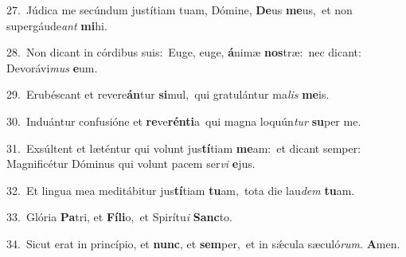{\numbfont\textcolor{\numbcolor}{27.}}~Júdica me secúndum justítiam tuam, Dómine, \textbf{De}\-us \textbf{me}\-us,~\star et non supergáude\textit{ant} \textbf{mi}\-hi.\par
{\numbfont\textcolor{\numbcolor}{28.}}~Non dicant in córdibus suis:~\dagger Euge, euge, \textbf{á}\-nimæ \textbf{nos}\-træ:~\star nec dicant: Devorávi\textit{mus} \textbf{e}\-um.\par
{\numbfont\textcolor{\numbcolor}{29.}}~Erubéscant et revere\-\textbf{án}\-tur \textbf{si}\-mul,~\star qui gratulántur ma\textit{lis} \textbf{me}\-is.\par
{\numbfont\textcolor{\numbcolor}{30.}}~Induántur confusióne et \textbf{re}\-ve\-\textbf{rén}\-\textbf{ti}a~\star qui magna loquún\textit{tur} \textbf{su}\-per me.\par
{\numbfont\textcolor{\numbcolor}{31.}}~Exsúltent et læténtur qui volunt jus\-\textbf{tí}\-tiam \textbf{me}\-am:~\star et dicant semper: Magnificétur Dóminus qui volunt pacem ser\textit{vi} \textbf{e}\-jus.\par
{\numbfont\textcolor{\numbcolor}{32.}}~Et lingua mea meditábitur jus\-\textbf{tí}\-tiam \textbf{tu}\-am,~\star tota die lau\textit{dem} \textbf{tu}\-am.\par
{\numbfont\textcolor{\numbcolor}{33.}}~Glória \textbf{Pa}\-tri, et \textbf{Fí}\-\textbf{li}o,~\star et Spirítu\textit{i} \textbf{Sanc}\-to.\par
{\numbfont\textcolor{\numbcolor}{34.}}~Sicut erat in princípio, et \textbf{nunc}\-, et \textbf{sem}\-per,~\star et in sǽcula sæculó\-\textit{rum}\-. \textbf{A}\-men.\par

